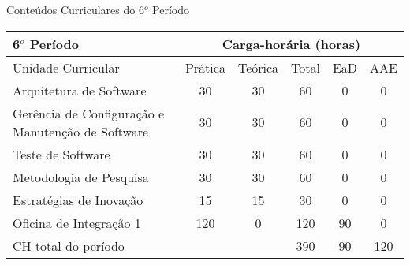 \begin{quadro}[ht!]
\centering
\caption{Conteúdos Curriculares do 6$^o$ Período}\label{qua:periodo6}
\begin{tabular}{|p{8.0cm}|c|c|c|c|c|}
\hline
\rowcolor{blue1} 6$^o$ Período & \multicolumn{5}{|c|}{\centering Carga-horária (horas)} \\ \hline
\rowcolor{blue1} Unidade Curricular & Prática & Teórica & Total & EaD & AAE \\ \hline
Arquitetura de Software & 30 & 30 & 60 & 0	&	0 \\	\hline
Gerência de Configuração e Manutenção de Software & 30 & 30 & 60 & 0	&	0 \\	\hline
Teste de Software & 30 & 30 & 60 & 0	&	0 \\	\hline
Metodologia de Pesquisa & 30 & 30 & 60 & 0	&	0 \\	\hline
Estratégias de Inovação & 15 & 15 & 30 & 0	&	0 \\	\hline
Oficina de Integração 1 & 120 & 0 & 120 & 90	&	0 \\	\hline
CH total do período & \multicolumn{2}{p{3.3cm}|}{\cellcolor{blue1}} & 390 & 90	&	120 \\ \hline
 \end{tabular} \end{quadro}